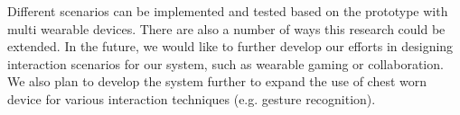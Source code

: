 Different scenarios can be implemented and tested based on the prototype with multi wearable devices. There are also a number of ways this research could be extended. In the future, we would like to further develop our efforts in designing interaction scenarios for our system, such as wearable gaming or collaboration. We also plan to develop the system further to expand the use of chest worn device for various interaction techniques (e.g. gesture recognition).
